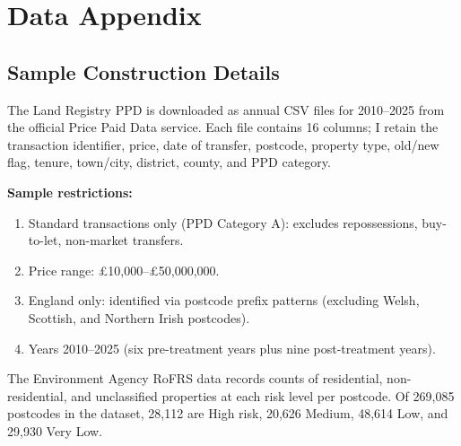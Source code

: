 \documentclass[12pt]{article}
\begin{document}
\label{apep_main_text_end}
\newpage


\newpage
\appendix

\section{Data Appendix} \label{app:data}

\subsection{Sample Construction Details}

The Land Registry PPD is downloaded as annual CSV files for 2010--2025 from the official Price Paid Data service. Each file contains 16 columns; I retain the transaction identifier, price, date of transfer, postcode, property type, old/new flag, tenure, town/city, district, county, and PPD category.

\textbf{Sample restrictions:}
\begin{enumerate}
\item Standard transactions only (PPD Category A): excludes repossessions, buy-to-let, non-market transfers.
\item Price range: \pounds10,000--\pounds50,000,000.
\item England only: identified via postcode prefix patterns (excluding Welsh, Scottish, and Northern Irish postcodes).
\item Years 2010--2025 (six pre-treatment years plus nine post-treatment years).
\end{enumerate}

The Environment Agency RoFRS data records counts of residential, non-residential, and unclassified properties at each risk level per postcode. Of 269,085 postcodes in the dataset, 28,112 are High risk, 20,626 Medium, 48,614 Low, and 29,930 Very Low.
\end{document}
